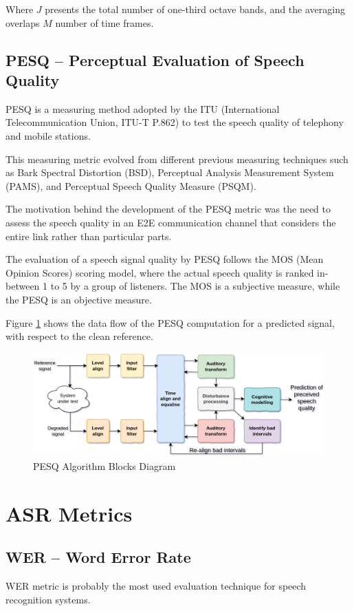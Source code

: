 Where \(J\) presents the total number of one-third octave bands,
and the averaging overlaps \(M\) number of time frames.

\subsection{PESQ -- Perceptual Evaluation of Speech Quality}
PESQ\cite{941023} is a measuring method adopted by 
the ITU (International Telecommunication Union, ITU-T P.862) to
test the speech quality of telephony and mobile stations.

This measuring metric evolved from different previous 
measuring techniques such as Bark Spectral Distortion (BSD),
Perceptual Analysis Measurement System (PAMS),
and Perceptual Speech Quality Measure (PSQM).

The motivation behind the development of the PESQ metric
was the need to assess the speech quality in an E2E
communication channel that considers 
the entire link rather than particular parts.

The evaluation of a speech signal quality by PESQ
follows the MOS (Mean Opinion Scores) scoring model, where
the actual speech quality is ranked in-between 1 to 5 
by a group of listeners. The MOS is a subjective measure,
while the PESQ is an objective measure.

Figure \ref{fig:pesq_blocks_diagram} shows the data flow
of the PESQ computation for a predicted signal, with respect to the
clean reference.

\begin{figure}[H]
    \centering
    \includegraphics[width=0.85\linewidth]{Features/images/pesq_blocks_diagram_new}
    \caption{PESQ Algorithm Blocks Diagram}\label{fig:pesq_blocks_diagram}
\end{figure}

\section{ASR Metrics}
\subsection{WER -- Word Error Rate}
WER\cite{KLAKOW200219} metric is probably the most used evaluation
technique for speech recognition systems.

